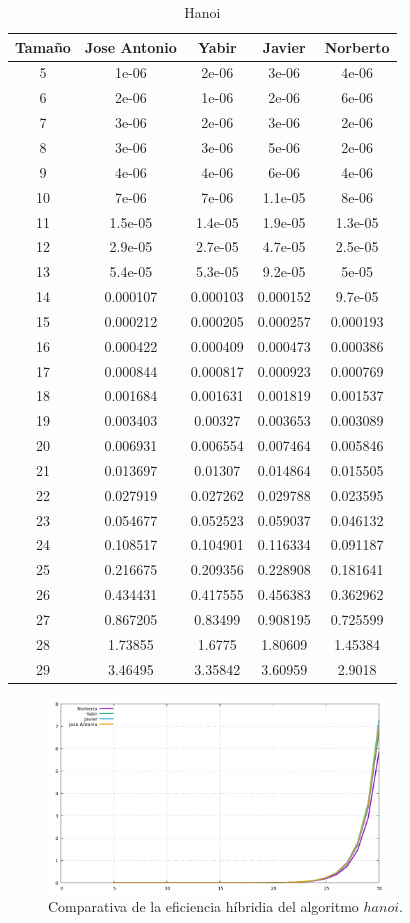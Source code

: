 \documentclass[11pt,a4paper]{article}
\begin{document}
\begin{table}[h]
	\centering
	\caption{Hanoi}
	\begin{tabular}{ | c | c  | c | c | c | }
		\hline
		Tama\~no & Jose Antonio & Yabir & Javier & Norberto\\ 
		\hline
		5	&	1e-06	&	2e-06	&	3e-06	&	4e-06	\\
		6	&	2e-06	&	1e-06	&	2e-06	&	6e-06	\\
		7	&	3e-06	&	2e-06	&	3e-06	&	2e-06	\\
		8	&	3e-06	&	3e-06	&	5e-06	&	2e-06	\\
		9	&	4e-06	&	4e-06	&	6e-06	&	4e-06	\\
		10	&	7e-06	&	7e-06	&	1.1e-05	&	8e-06	\\
		11	&	1.5e-05	&	1.4e-05	&	1.9e-05	&	1.3e-05	\\
		12	&	2.9e-05	&	2.7e-05	&	4.7e-05	&	2.5e-05	\\
		13	&	5.4e-05	&	5.3e-05	&	9.2e-05	&	5e-05	\\
		14	&	0.000107	&	0.000103	&	0.000152	&	9.7e-05	\\
		15	&	0.000212	&	0.000205	&	0.000257	&	0.000193	\\
		16	&	0.000422	&	0.000409	&	0.000473	&	0.000386	\\
		17	&	0.000844	&	0.000817	&	0.000923	&	0.000769	\\
		18	&	0.001684	&	0.001631	&	0.001819	&	0.001537	\\
		19	&	0.003403	&	0.00327	&	0.003653	&	0.003089	\\
		20	&	0.006931	&	0.006554	&	0.007464	&	0.005846	\\
		21	&	0.013697	&	0.01307	&	0.014864	&	0.015505	\\
		22	&	0.027919	&	0.027262	&	0.029788	&	0.023595	\\
		23	&	0.054677	&	0.052523	&	0.059037	&	0.046132	\\
		24	&	0.108517	&	0.104901	&	0.116334	&	0.091187	\\
		25	&	0.216675	&	0.209356	&	0.228908	&	0.181641	\\
		26	&	0.434431	&	0.417555	&	0.456383	&	0.362962	\\
		27	&	0.867205	&	0.83499	&	0.908195	&	0.725599	\\
		28	&	1.73855	&	1.6775	&	1.80609	&	1.45384	\\
		29	&	3.46495	&	3.35842	&	3.60959	&	2.9018	\\
		\hline
	\end{tabular}
\end{table}

\begin{figure}[H]
	\centering
	\includegraphics[width=0.8\textwidth]{../plots/hanoi}
	\caption{Comparativa de la eficiencia híbridia del algoritmo $hanoi$.}
\end{figure}
\end{document}
